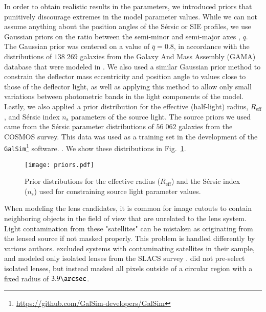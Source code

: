 \documentclass[tradiabstract,twocolumn]{aa}
\begin{document}
In order to obtain realistic results in the parameters, we introduced priors that punitively discourage extremes in the model parameter values. While we can not assume anything about the position angles of the S\'ersic or SIE profiles, we use Gaussian priors on the ratio between the semi-minor and semi-major axes%
, $q$. The Gaussian prior was centered on a value of $\bar{q} = 0.8$, in accordance with the distributions of $138\;269$ galaxies from the Galaxy And Mass Assembly (GAMA) database that were modeled in \citet{Kelvin2012}. We also used a similar Gaussian prior method to constrain the deflector mass eccentricity and position angle to values close to those of the deflector light, as well as applying this method to allow only small variations between photometric bands in the light components of the model. Lastly, we also applied a prior distribution for the effective (half-light) radius, $R_{\text{eff}}$, and S\'ersic index $n_{\text{s}}$ parameters of the source light. The source priors we used came from the S\'ersic parameter distributions of $56\; 062$ galaxies from the COSMOS survey. This data was used as a training set in the development of the {\tt GalSim}\footnote{\url{https://github.com/GalSim-developers/GalSim}} software. \citep{Rowe2015}. %
We show these distributions in Fig.~\ref{Fig: source priors}.


\begin{figure}
\texttt{[image: priors.pdf]}
\caption{Prior distributions for the effective radius ($R_{\text{eff}}$) and the S\'ersic index ($n_{\text{s}}$) used for constraining source light parameter values.}
\label{Fig: source priors}
\end{figure}
   
When modeling the lens candidates, it is common for image cutouts to contain neighboring objects in the field of view that are unrelated to the lens system. Light contamination from these "satellites" can be mistaken as originating from the lensed source if not masked properly. This problem is handled differently by various authors. \citet{Shajib2020} excluded systems with contaminating satellites in their sample, and modeled only isolated lenses from the SLACS survey \citep{Auger2009}. \citet{Night2018} did not pre-select isolated lenses, but instead masked all pixels outside of a circular region with a fixed radius of $3.9\arcsec$.
\end{document}
